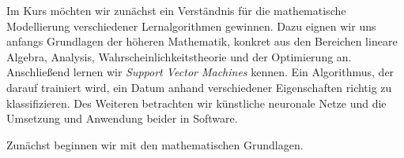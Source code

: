 Im Kurs möchten wir zunächst ein Verständnis für die mathematische Modellierung verschiedener Lernalgorithmen gewinnen. Dazu eignen wir uns anfangs Grundlagen der höheren Mathematik, konkret aus den Bereichen lineare Algebra, Analysis, Wahrscheinlichkeitstheorie und der Optimierung an. Anschließend lernen wir \emph{Support Vector Machines} kennen. Ein Algorithmus, der darauf trainiert wird, ein Datum anhand verschiedener Eigenschaften richtig zu klassifizieren. Des Weiteren betrachten wir künstliche neuronale Netze und die Umsetzung und Anwendung beider in Software.

Zunächst beginnen wir mit den mathematischen Grundlagen.